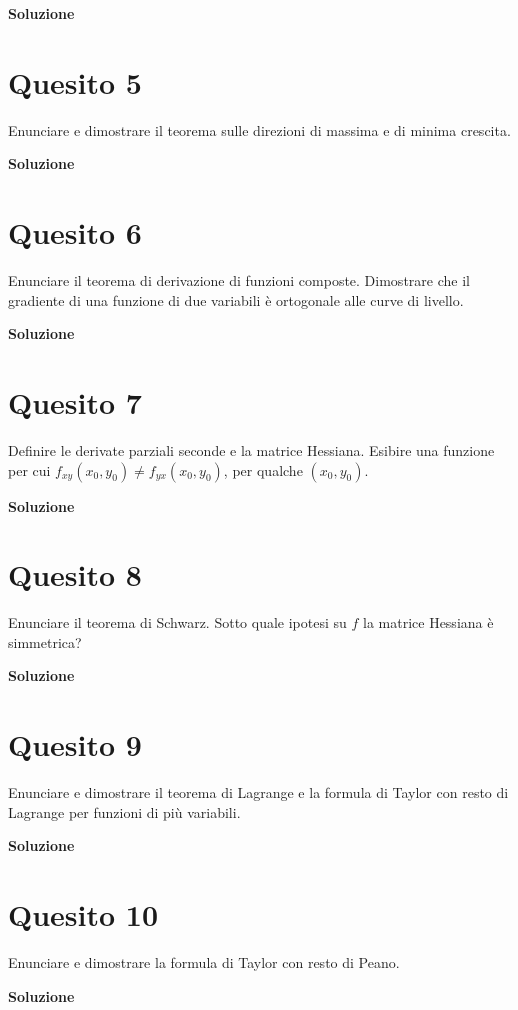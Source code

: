 \medskip
\begin{large}
\textbf{Soluzione}
\end{large}


\section*{Quesito 5}
Enunciare e dimostrare il teorema sulle direzioni di massima e di minima
crescita.

\medskip
\begin{large}
\textbf{Soluzione}
\end{large}


\section*{Quesito 6}
Enunciare il teorema di derivazione di funzioni composte. Dimostrare che il
gradiente di una funzione di due variabili è ortogonale alle curve di livello.

\medskip
\begin{large}
\textbf{Soluzione}
\end{large}


\section*{Quesito 7}
Definire le derivate parziali seconde e la matrice Hessiana. Esibire una funzione
per cui $f_{xy}(x_0,y_0)\neq f_{yx}(x_0,y_0)$, per qualche $(x_0, y_0)$.

\medskip
\begin{large}
\textbf{Soluzione}
\end{large}


\section*{Quesito 8}
Enunciare il teorema di Schwarz. Sotto quale ipotesi su $f$ la matrice Hessiana
è simmetrica?

\medskip
\begin{large}
\textbf{Soluzione}
\end{large}


\section*{Quesito 9}
Enunciare e dimostrare il teorema di Lagrange e la formula di Taylor con resto
di Lagrange per funzioni di più variabili.


\medskip
\begin{large}
\textbf{Soluzione}
\end{large}


\section*{Quesito 10}
Enunciare e dimostrare la formula di Taylor con resto di Peano.

\medskip
\begin{large}
\textbf{Soluzione}
\end{large}

